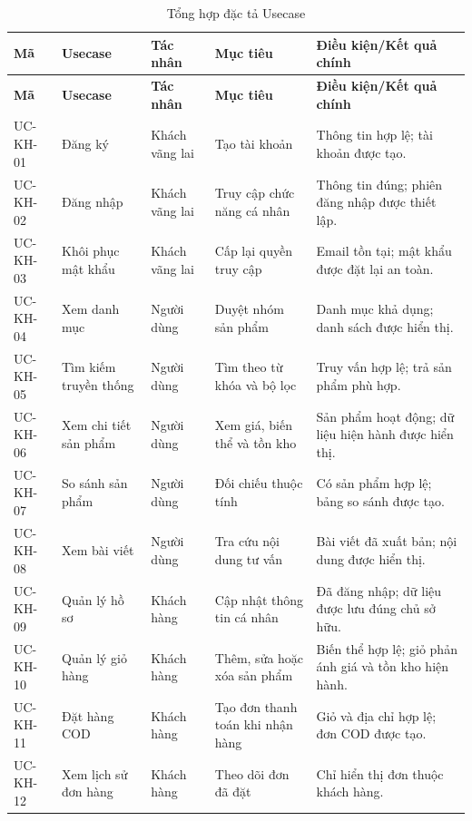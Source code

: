 \small
\begin{longtable}{|p{}|p{}|p{}|p{}|p{}|}
    \caption{Tổng hợp đặc tả Usecase}\label{tab:usecase-summary}\\
    \hline
    \textbf{Mã} & \textbf{Usecase} & \textbf{Tác nhân} & \textbf{Mục tiêu} & \textbf{Điều kiện/Kết quả chính} \\ \hline
    \endfirsthead
    \hline
    \textbf{Mã} & \textbf{Usecase} & \textbf{Tác nhân} & \textbf{Mục tiêu} & \textbf{Điều kiện/Kết quả chính} \\ \hline
    \endhead
    UC-KH-01 & Đăng ký & Khách vãng lai & Tạo tài khoản & Thông tin hợp lệ; tài khoản được tạo. \\ \hline
    UC-KH-02 & Đăng nhập & Khách vãng lai & Truy cập chức năng cá nhân & Thông tin đúng; phiên đăng nhập được thiết lập. \\ \hline
    UC-KH-03 & Khôi phục mật khẩu & Khách vãng lai & Cấp lại quyền truy cập & Email tồn tại; mật khẩu được đặt lại an toàn. \\ \hline
    UC-KH-04 & Xem danh mục & Người dùng & Duyệt nhóm sản phẩm & Danh mục khả dụng; danh sách được hiển thị. \\ \hline
    UC-KH-05 & Tìm kiếm truyền thống & Người dùng & Tìm theo từ khóa và bộ lọc & Truy vấn hợp lệ; trả sản phẩm phù hợp. \\ \hline
    UC-KH-06 & Xem chi tiết sản phẩm & Người dùng & Xem giá, biến thể và tồn kho & Sản phẩm hoạt động; dữ liệu hiện hành được hiển thị. \\ \hline
    UC-KH-07 & So sánh sản phẩm & Người dùng & Đối chiếu thuộc tính & Có sản phẩm hợp lệ; bảng so sánh được tạo. \\ \hline
    UC-KH-08 & Xem bài viết & Người dùng & Tra cứu nội dung tư vấn & Bài viết đã xuất bản; nội dung được hiển thị. \\ \hline
    UC-KH-09 & Quản lý hồ sơ & Khách hàng & Cập nhật thông tin cá nhân & Đã đăng nhập; dữ liệu được lưu đúng chủ sở hữu. \\ \hline
    UC-KH-10 & Quản lý giỏ hàng & Khách hàng & Thêm, sửa hoặc xóa sản phẩm & Biến thể hợp lệ; giỏ phản ánh giá và tồn kho hiện hành. \\ \hline
    UC-KH-11 & Đặt hàng COD & Khách hàng & Tạo đơn thanh toán khi nhận hàng & Giỏ và địa chỉ hợp lệ; đơn COD được tạo. \\ \hline
    UC-KH-12 & Xem lịch sử đơn hàng & Khách hàng & Theo dõi đơn đã đặt & Chỉ hiển thị đơn thuộc khách hàng. \\ \hline

\end{longtable}
